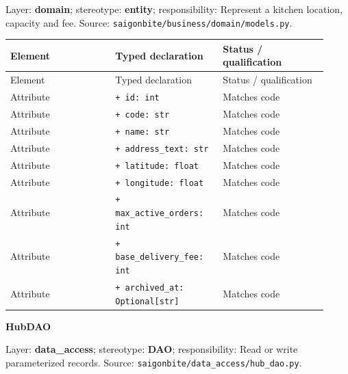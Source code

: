 Layer: \textbf{domain}; stereotype: \textbf{\guillemotleft{}entity\guillemotright{}}; responsibility: Represent a kitchen location, capacity and fee. Source: \texttt{saigonbite/\allowbreak{}business/\allowbreak{}domain/\allowbreak{}models.\allowbreak{}py}.

\begin{longtable}{>{\raggedright\arraybackslash}p{0.3067\linewidth}>{\raggedright\arraybackslash}p{0.3067\linewidth}>{\raggedright\arraybackslash}p{0.3067\linewidth}}
Element & Typed declaration & Status / qualification \\
\hline\endfirsthead
Element & Typed declaration & Status / qualification \\
\hline\endhead
Attribute & \texttt{+ id: int} & Matches code \\
Attribute & \texttt{+ code: str} & Matches code \\
Attribute & \texttt{+ name: str} & Matches code \\
Attribute & \texttt{+ address\_\allowbreak{}text: str} & Matches code \\
Attribute & \texttt{+ latitude: float} & Matches code \\
Attribute & \texttt{+ longitude: float} & Matches code \\
Attribute & \texttt{+ max\_\allowbreak{}active\_\allowbreak{}orders: int} & Matches code \\
Attribute & \texttt{+ base\_\allowbreak{}delivery\_\allowbreak{}fee: int} & Matches code \\
Attribute & \texttt{+ archived\_\allowbreak{}at: Optional[str]} & Matches code \\
\end{longtable}
\textbf{HubDAO}

Layer: \textbf{data\_access}; stereotype: \textbf{\guillemotleft{}DAO\guillemotright{}}; responsibility: Read or write parameterized records. Source: \texttt{saigonbite/\allowbreak{}data\_\allowbreak{}access/\allowbreak{}hub\_\allowbreak{}dao.\allowbreak{}py}.

